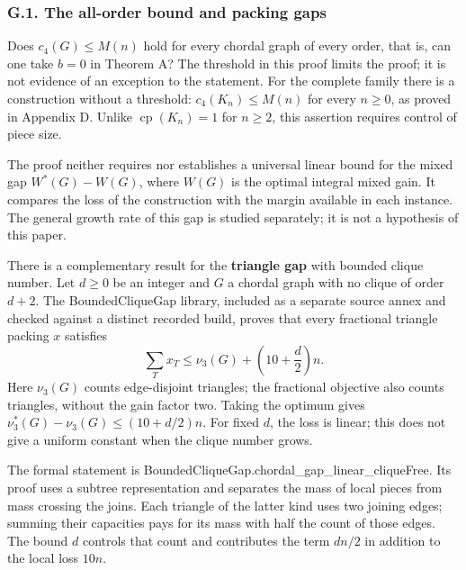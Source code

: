 \documentclass[english,11pt,a4paper]{article}
\begin{document}
\subsubsection{G.1. The all-order bound and packing gaps}\label{g.1.-the-all-order-bound-and-packing-gaps}

Does \(c_4(G)\le M(n)\) hold for every chordal graph of every order, that is, can one take \(b=0\) in Theorem A? The threshold in this proof limits the proof; it is not evidence of an exception to the statement. For the complete family there is a construction without a threshold: \(c_4(K_n)\le M(n)\) for every \(n\ge0\), as proved in Appendix D. Unlike \(\operatorname{cp}(K_n)=1\) for \(n\ge2\), this assertion requires control of piece size.

The proof neither requires nor establishes a universal linear bound for the mixed gap \(W^*(G)-W(G)\), where \(W(G)\) is the optimal integral mixed gain. It compares the loss of the construction with the margin available in each instance. The general growth rate of this gap is studied separately; it is not a hypothesis of this paper.

There is a complementary result for the \textbf{triangle gap} with bounded clique number. Let \(d\ge0\) be an integer and \(G\) a chordal graph with no clique of order \(d+2\). The {\ttfamily\small BoundedCliqu\discretionary{\hbox{\ensuremath{\hookrightarrow}}}{}{}eGap} library, included as a separate source annex and checked against a distinct recorded build, proves that every fractional triangle packing \(x\) satisfies \[
\sum_T x_T\le \nu_3(G)+\left(10+\frac d2\right)n.
\tag{G.1}
\] Here \(\nu_3(G)\) counts edge-disjoint triangles; the fractional objective also counts triangles, without the gain factor two. Taking the optimum gives \(\nu_3^*(G)-\nu_3(G)\le(10+d/2)n\). For fixed \(d\), the loss is linear; this does not give a uniform constant when the clique number grows.

The formal statement is {\ttfamily\small BoundedCliqu\discretionary{\hbox{\ensuremath{\hookrightarrow}}}{}{}eGap.\discretionary{\hbox{\ensuremath{\hookrightarrow}}}{}{}chordal\_\discretionary{\hbox{\ensuremath{\hookrightarrow}}}{}{}gap\_\discretionary{\hbox{\ensuremath{\hookrightarrow}}}{}{}linear\_\discretionary{\hbox{\ensuremath{\hookrightarrow}}}{}{}cliqueFree}. Its proof uses a subtree representation and separates the mass of local pieces from mass crossing the joins. Each triangle of the latter kind uses two joining edges; summing their capacities pays for its mass with half the count of those edges. The bound \(d\) controls that count and contributes the term \(dn/2\) in addition to the local loss \(10n\).
\end{document}
